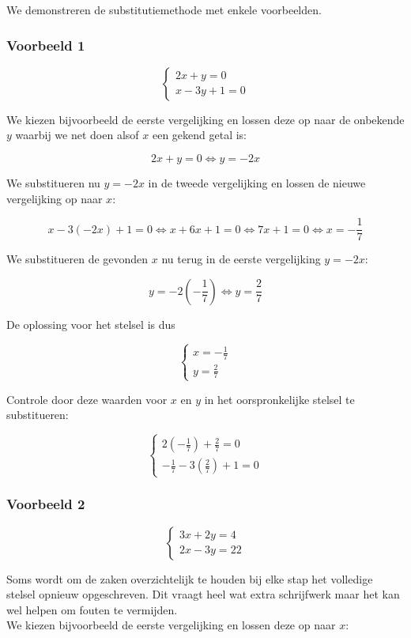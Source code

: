 We demonstreren de substitutiemethode met enkele voorbeelden.\\

\subsubsection{Voorbeeld 1}

\[\left\{ \begin{array}{l}
2x+y=0 \\
x-3y+1=0
\end{array} \right.\]

We kiezen bijvoorbeeld de eerste vergelijking en lossen deze op naar de onbekende $y$ waarbij we net doen alsof $x$ een gekend getal is:

\[ 2x+y=0 \Leftrightarrow y=-2x \]

We substitueren nu $y=-2x$ in de tweede vergelijking en lossen de nieuwe vergelijking op naar $x$:

\[ x-3(-2x)+1=0 \Leftrightarrow x+6x+1=0 \Leftrightarrow 7x+1=0 \Leftrightarrow x=-\frac{1}{7} \]

We substitueren de gevonden $x$ nu terug in de eerste vergelijking $y=-2x$:

\[ y=-2(-\frac{1}{7}) \Leftrightarrow y=\frac{2}{7} \]

De oplossing voor het stelsel is dus

\[ \left\{ \begin{array}{l}
x=-\frac{1}{7} \\
y=\frac{2}{7}
\end{array} \right. \]

Controle door deze waarden voor $x$ en $y$ in het oorspronkelijke stelsel te substitueren:

\[ \left\{ \begin{array}{l}
2(-\frac{1}{7})+\frac{2}{7}=0 \\
-\frac{1}{7}-3(\frac{2}{7})+1=0
\end{array} \right.\]

\subsubsection{Voorbeeld 2}

\[\left\{ \begin{array}{l}
3x + 2y = 4\\
2x - 3y = 22
\end{array} \right.\]

Soms wordt om de zaken overzichtelijk te houden bij elke stap het volledige stelsel opnieuw opgeschreven. Dit vraagt heel wat extra schrijfwerk maar het kan wel helpen om fouten te vermijden.\\
We kiezen bijvoorbeeld de eerste vergelijking en lossen deze op naar $x$:

